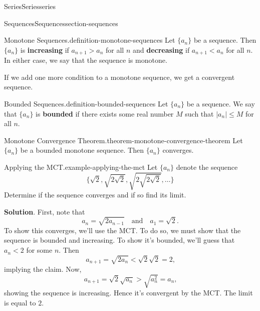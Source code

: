 \documentclass[oneside,10pt,]{book}
\newcommand{\terminology}[1]{\textbf{#1}}
\numberwithin{equation}{section}
\newcommand{\lt}{<}
\newcommand{\gt}{>}
\begin{document}
\begin{chapterptx}{Series}{}{Series}{}{}{series}
\begin{sectionptx}{Sequences}{}{Sequences}{}{}{section-sequences}
\begin{definition}{Monotone Sequences.}{definition-monotone-sequences}
\hypertarget{p-820}{}%
Let \(\{a_{n}\}\) be a sequence. Then \(\{a_{n}\}\) is \terminology{increasing} if \(a_{n+1} \gt a_{n}\) for all \(n\) and \terminology{decreasing} if \(a_{n+1}\lt a_{n} \) for all \(n\). In either case, we say that the sequence is monotone.%
\end{definition}
\hypertarget{p-821}{}%
If we add one more condition to a monotone sequence, we get a convergent sequence.%
\begin{definition}{Bounded Sequences.}{definition-bounded-sequences}%
\hypertarget{p-822}{}%
Let \(\{a_{n}\}\) be a sequence. We say that \(\{a_{n}\}\) is \terminology{bounded} if there exists some real number \(M\) such that \(|a_{n}| \leq M\) for all \(n\).%
\end{definition}
\begin{theorem}{Monotone Convergence Theorem.}{}{theorem-monotone-convergence-theorem}%
\hypertarget{p-823}{}%
Let \(\{a_{n}\}\) be a bounded monotone sequence. Then \(\{a_{n}\}\) converges.%
\end{theorem}
\begin{example}{Applying the MCT.}{example-applying-the-mct}%
\hypertarget{p-824}{}%
Let \(\{a_{n}\}\) denote the sequence%
\begin{equation*}
\{\sqrt{2}, \sqrt{2\sqrt{2}}, \sqrt{2\sqrt{2\sqrt{2}}},\ldots\}
\end{equation*}
Determine if the sequence converges and if so find its limit.%
\par\smallskip%
\noindent\textbf{Solution}.\hypertarget{solution-170}{}\quad%
\hypertarget{p-825}{}%
First, note that%
\begin{equation*}
a_{n} = \sqrt{2a_{n-1}}\quad\text{and}\quad a_{1} = \sqrt{2}.
\end{equation*}
To show this converges, we'll use the MCT. To do so, we must show that the sequence is bounded and increasing. To show it's bounded, we'll guess that \(a_{n}\lt 2\) for some \(n\). Then%
\begin{equation*}
a_{n+1} = \sqrt{2a_{n}}\lt \sqrt{2}\sqrt{2} = 2\text{,}
\end{equation*}
implying the claim. Now,%
\begin{equation*}
a_{n+1} = \sqrt{2}\sqrt{a_{n}} \gt \sqrt{a_{n}^{2}} = a_{n}\text{,}
\end{equation*}
showing the sequence is increasing. Hence it's convergent by the MCT. The limit is equal to \(2\).%
\end{example}
\end{sectionptx}
%
%
\typeout{************************************************}

\end{chapterptx}
\end{document}
